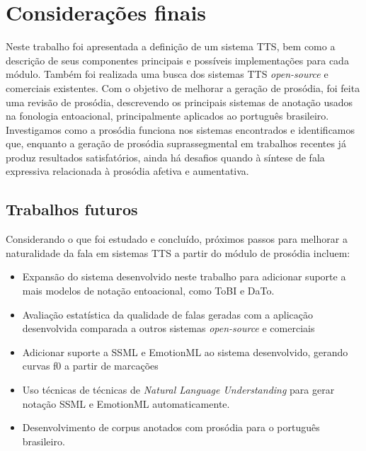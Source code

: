 
\chapter{Considerações finais}
Neste trabalho foi apresentada a definição de um sistema TTS, bem como a descrição
de seus componentes principais e possíveis implementações para cada módulo.
Também foi realizada uma busca dos sistemas TTS \emph{open-source} e comerciais
existentes. Com o objetivo de melhorar a geração de prosódia, foi feita uma
revisão de prosódia, descrevendo os principais sistemas de anotação usados na
fonologia entoacional, principalmente aplicados ao português brasileiro.
Investigamos como a prosódia funciona nos sistemas encontrados e identificamos
que, enquanto a geração de prosódia suprassegmental em trabalhos recentes já
produz resultados satisfatórios, ainda há desafios quando à síntese de fala
expressiva relacionada à prosódia afetiva e aumentativa.

\section{Trabalhos futuros}
Considerando o que foi estudado e concluído, próximos passos para melhorar a
naturalidade da fala em sistemas TTS a partir do módulo de prosódia incluem:

\begin{itemize}
\item Expansão do sistema desenvolvido neste trabalho para adicionar suporte a
  mais modelos de notação entoacional, como ToBI e DaTo.
\item Avaliação estatística da qualidade de falas geradas com a aplicação desenvolvida comparada a outros sistemas \emph{open-source} e comerciais
\item Adicionar suporte a SSML e EmotionML ao sistema desenvolvido, gerando
  curvas f0 a partir de marcações
\item Uso técnicas de técnicas de \emph{Natural Language Understanding} para
  gerar notação SSML e EmotionML automaticamente.
\item Desenvolvimento de corpus anotados com prosódia para o português brasileiro.
\end{itemize}


